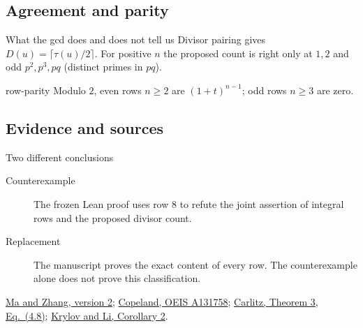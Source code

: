 \documentclass{beamer}
\begin{document}
\subsection{Agreement and parity}
\begin{frame}{What the gcd does and does not tell us}
  Divisor pairing gives $D(u)=\lceil\tau(u)/2\rceil$. For positive $n$ the proposed count is right only at $1,2$ and odd $p^2,p^3,pq$ (distinct primes in $pq$).
  \begin{bookresult}{row-parity}
    Modulo $2$, even rows $n\ge2$ are $(1+t)^{n-1}$; odd rows $n\ge3$ are zero.
  \end{bookresult}
\end{frame}

\subsection{Evidence and sources}
\begin{frame}{Two different conclusions}
  \begin{description}
    \item[Counterexample] The frozen Lean proof uses row $8$ to refute the joint assertion of integral rows and the proposed divisor count.
    \item[Replacement] The manuscript proves the exact content of every row. The counterexample alone does not prove this classification.
  \end{description}
  \small
  \href{https://doi.org/10.5281/zenodo.24445683}{Ma and Zhang, version 2};
  \href{https://oeis.org/A131758}{Copeland, OEIS A131758};
  \href{https://doi.org/10.1007/BF01180274}{Carlitz, Theorem 3, Eq.~(4.8)};
  \href{https://math.colgate.edu/~integers/q57/q57.pdf}{Krylov and Li, Corollary 2}.
\end{frame}
\end{document}
